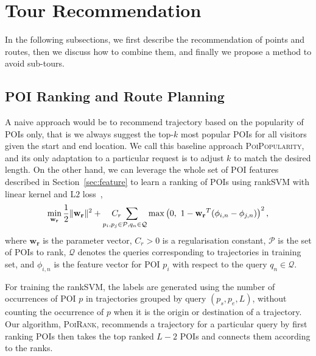 
\section{Tour Recommendation}
\label{sec:recommendation}
\secmoveup

In the following subsections, we first describe the recommendation of points and routes,
then we discuss how to combine them, and finally we propose a method to avoid sub-tours.

\subsection{POI Ranking and Route Planning}
\label{sec:rankplan}
\secmoveup

A naive approach would be to recommend trajectory based on the popularity of POIs only,
that is we always suggest the top-$k$ most popular POIs for all visitors given the start and end location.
We call this baseline approach \textsc{PoiPopularity},
and its only adaptation to a particular request is to adjust $k$ to match the desired length.
%
On the other hand, we can leverage the whole set of POI features described in Section~\ref{sec:feature}
to learn a ranking of POIs using rankSVM with linear kernel and L$2$ loss~\cite{lranksvm},
\eqmoveup
\begin{equation*}
\eqmoveup
\min_{\mathbf{w_r}} \frac{1}{2}
                     \|\mathbf{w_r}\|^2 +
                    \underset{p_i, p_j \in \mathcal{P}, q_n \in \mathcal{Q}}{C_r ~\sum}
                    \max \left( 0,~ 1 - \mathbf{w_r}^T (\phi_{i,n} - \phi_{j,n}) \right)^2,
\end{equation*}
where $\mathbf{w_r}$ is the parameter vector,
$C_r > 0$ is a regularisation constant,
$\mathcal{P}$ is the set of POIs to rank,
$\mathcal{Q}$ denotes the queries corresponding to trajectories in training set,
and $\phi_{i,n}$ is the feature vector for POI $p_i$ with respect to the query $q_n \in \mathcal{Q}$.

For training the rankSVM, the labels are generated using the number of occurrences of
POI $p$ in trajectories grouped by query $(p_s, p_e, L)$,
without counting the occurrence of $p$ when it is the origin or destination of a trajectory.
Our algorithm, \textsc{PoiRank}, recommends a trajectory for a particular query
by first ranking POIs
then takes the top ranked $L-2$ POIs and connects them according to the ranks.



